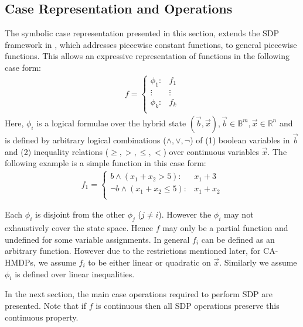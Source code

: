 \documentclass[twoside,11pt]{article}
\begin{document}
\subsection{Case Representation and Operations}
\label{sec:caserep}
The symbolic case representation presented in this section, extends the SDP framework in \cite{fomdp}, which addresses piecewise constant functions, to general piecewise functions. This allows an expressive representation of functions in the following case form:
{%
\begin{align*}
f = 
\begin{cases}
  \phi_1: & f_1 \\ 
 \vdots&\vdots\\ 
  \phi_k: & f_k \\ 
\end{cases}
\end{align*}
}
Here, $\phi_i$ is a logical formulae over the hybrid state $(\vec{b},\vec{x}), \vec{b} \in \mathbb{B}^m, \vec{x} \in \mathbb{R}^n$ and is defined by arbitrary logical combinations ($\land,\lor,\neg$) of 
(1) boolean variables in $\vec{b}$ and (2) 
inequality relations ($\geq,>,\leq,<$) over continuous variables $\vec{x}$. 
The following example is a simple function in this case form: 
\begin{align*}
f_1 = 
\begin{cases}
b \wedge (x_1+x_2 >5) : & x_1+3 \\ 
\neg b \wedge (x_1+x_2 \leq 5) : & x_1+x_2 \\ 
\end{cases} 
\end{align*}

Each $\phi_i$ is disjoint from the other $\phi_j$ ($j \neq i$). However the $\phi_i$ may not exhaustively cover the state space. Hence $f$ may only be a partial function and undefined for some variable assignments. 
In general $f_i$ can be defined as an arbitrary function. However due to the restrictions mentioned later, for CA-HMDPs, we assume $f_i$ to be either linear or quadratic on $\vec{x}$. Similarly we assume $\phi_i$ is defined over linear inequalities.

In the next section, the main case operations required to perform SDP are presented. Note that if $f$ is continuous then all SDP operations preserve this continuous property. 
\end{document}
